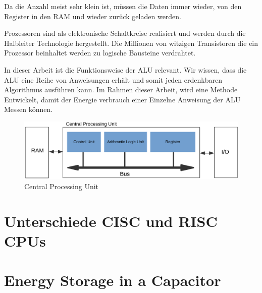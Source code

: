Da die Anzahl meist sehr klein ist, müssen die Daten immer wieder, von den Register in den RAM und wieder zurück geladen werden.
\par
Prozessoren sind als elektronische Schaltkreise realisiert und werden durch die Halbleiter Technologie hergestellt. Die Millionen von witzigen Transistoren die ein Prozessor beinhaltet werden zu logische Bausteine verdrahtet.
\par
In dieser Arbeit ist die Funktionsweise der ALU relevant. Wir wissen, dass die ALU eine Reihe von Anweisungen erhält und somit jeden erdenkbaren Algorithmus ausführen kann. Im Rahmen dieser Arbeit, wird eine Methode Entwickelt, damit der Energie verbrauch einer Einzelne Anweisung der ALU Messen können.



\begin{figure}[t]
\centering
\includegraphics[width=1.0\textwidth]{images/cpu.pdf}
\caption{Central Processing Unit}
\label{fig:CPU}
\end{figure}



\section{Unterschiede CISC und RISC CPUs}



\section{Energy Storage in a Capacitor}
